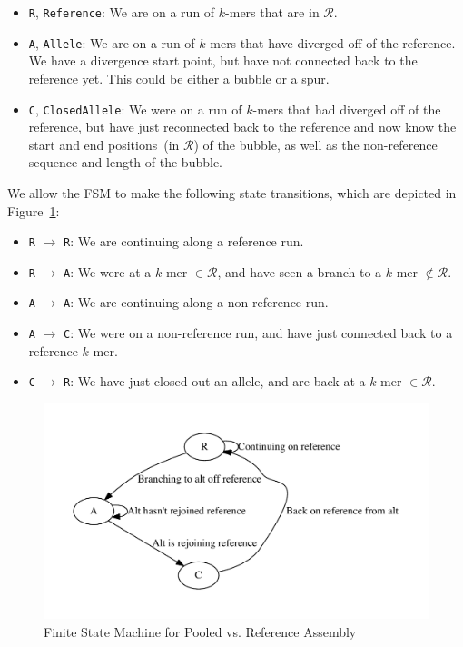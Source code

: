 \documentclass[11pt]{article}
\begin{document}
\begin{itemize}
\item \texttt{R}, \texttt{Reference}: We are on a run of $k$-mers that are in $\mathcal{R}$.
\item \texttt{A}, \texttt{Allele}: We are on a run of $k$-mers that have diverged off of the reference. We
have a divergence start point, but have not connected back to the reference yet. This could be either
a bubble or a spur. 
\item \texttt{C}, \texttt{ClosedAllele}: We were on a run of $k$-mers that had diverged off of the reference,
but have just reconnected back to the reference and now know the start and end positions~(in
$\mathcal{R}$) of the bubble, as well as the non-reference sequence and length of the bubble.
\end{itemize}

We allow the FSM to make the following state transitions, which are depicted in Figure~\ref{fig:fsm}:

\begin{itemize}
\item \texttt{R} $\rightarrow$ \texttt{R}: We are continuing along a reference run.
\item \texttt{R} $\rightarrow$ \texttt{A}: We were at a $k$-mer $\in \mathcal{R}$, and have seen a branch
to a $k$-mer $\not\in \mathcal{R}$.
\item \texttt{A} $\rightarrow$ \texttt{A}: We are continuing along a non-reference run.
\item \texttt{A} $\rightarrow$ \texttt{C}: We were on a non-reference run, and have just connected back to
a reference $k$-mer.
\item \texttt{C} $\rightarrow$ \texttt{R}: We have just closed out an allele, and are back at a $k$-mer
$\in \mathcal{R}$.
\end{itemize}

\begin{figure}[h]
\begin{center}
\includegraphics[width=0.5\linewidth, clip=true, trim=0 39 0 39]{graphs/fsm.pdf}
\end{center}
\caption{Finite State Machine for Pooled vs. Reference Assembly}
\label{fig:fsm}
\end{figure}
\end{document}
